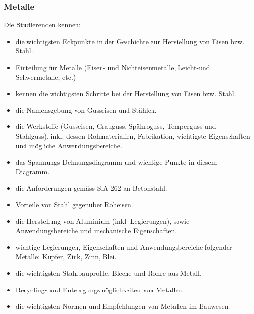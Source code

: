 \subsubsection*{Metalle}
Die Studierenden kennen: 
\begin{itemize}
  \item die wichtigsten Eckpunkte in der Geschichte zur Herstellung von Eisen bzw. Stahl.
  \item Einteilung für Metalle (Eisen- und Nichteisenmetalle, Leicht-und Schwermetalle, etc.)
  \item kennen die wichtigsten Schritte bei der Herstellung von Eisen bzw. Stahl.
  \item die Namensgebung von Gusseisen und Stählen.
  \item die Werkstoffe (Gusseisen, Grauguss, Spähroguss, Temperguss und Stahlguss), inkl. dessen Rohmaterialien, Fabrikation, wichtigste Eigenschaften und 	mögliche Anwendungsbereiche.
  \item das Spannungs-Dehnungsdiagramm und wichtige Punkte in diesem Diagramm.
  \item die Anforderungen gemäss SIA 262 an Betonstahl.
  \item Vorteile von Stahl gegenüber Roheisen.
  \item die Herstellung von Aluminium (inkl. Legierungen), sowie Anwendungsbereiche und mechanische Eigenschaften.
  \item wichtige Legierungen, Eigenschaften und Anwendungsbereiche folgender Metalle: Kupfer, Zink, Zinn, Blei.
  \item die wichtigsten Stahlbauprofile, Bleche und Rohre aus Metall.
  \item Recycling- und Entsorgungsmöglichkeiten von Metallen.
  \item die wichtigsten Normen und Empfehlungen von Metallen im Bauwesen.
\end{itemize}